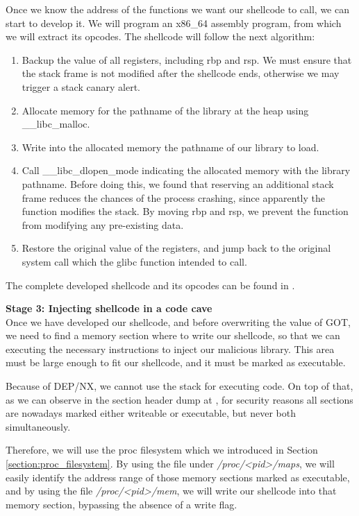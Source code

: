 Once we know the address of the functions we want our shellcode to call, we can start to develop it. We will program an x86\_64 assembly program, from which we will extract its opcodes. The shellcode will follow the next algorithm:
\begin{enumerate}
\item Backup the value of all registers, including rbp and rsp. We must ensure that the stack frame is not modified after the shellcode ends, otherwise we may trigger a stack canary alert.
\item Allocate memory for the pathname of the library at the heap using \_\_libc\_malloc.
\item Write into the allocated memory the pathname of our library to load.
\item Call \_\_libc\_dlopen\_mode indicating the allocated memory with the library pathname. Before doing this, we found that reserving an additional stack frame reduces the chances of the process crashing, since apparently the function modifies the stack. By moving rbp and rsp, we prevent the function from modifying any pre-existing data.
\item Restore the original value of the registers, and jump back to the original system call which the glibc function intended to call.
\end{enumerate}

The complete developed shellcode and its opcodes can be found in .


\textbf{Stage 3: Injecting shellcode in a code cave}\\
Once we have developed our shellcode, and before overwriting the value of GOT, we need to find a memory section where to write our shellcode, so that we can executing the necessary instructions to inject our malicious library. This area must be large enough to fit our shellcode, and it must be marked as executable. 

Because of DEP/NX, we cannot use the stack for executing code. On top of that, as we can observe in the section header dump at , for security reasons all sections are nowadays marked either writeable or executable, but never both simultaneously.

Therefore, we will use the proc filesystem which we introduced in Section \ref{section:proc_filesystem}. By using the file under \textit{/proc/<pid>/maps}, we will easily identify the address range of those memory sections marked as executable, and by using the file \textit{/proc/<pid>/mem}, we will write our shellcode into that memory section, bypassing the absence of a write flag.

